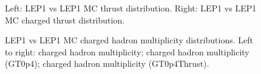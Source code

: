 \begin{figure}[H]
\centering
{}\hfill
{}\hfill %
\caption{Left: LEP1 vs LEP1 MC thrust distribution. Right: LEP1 vs LEP1 MC charged thrust distribution.}
\end{figure}

\begin{figure}[H]
\centering
{}\hfill
{}\hfill
{}\hfill
\caption{LEP1 vs LEP1 MC charged hadron multiplicity distributions. Left to right: charged hadron multiplicity; charged hadron multiplicity (GT0p4); charged hadron multiplicity (GT0p4Thrust).}
\end{figure}

